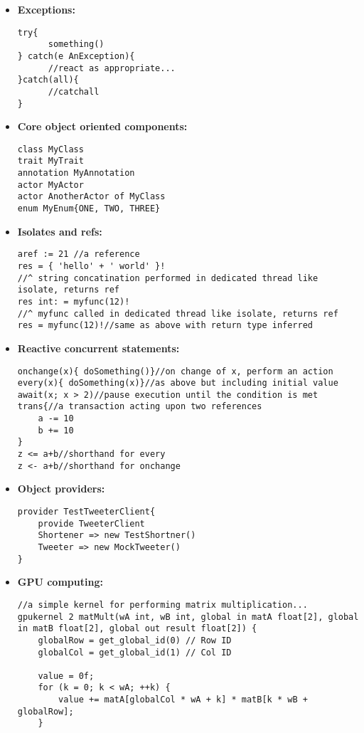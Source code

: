\documentclass[conc-doc]{subfiles}
\begin{document}
\begin{itemize}
	
	\item \textbf{Exceptions:}
\begin{lstlisting}
try{
	  something()
} catch(e AnException){
	  //react as appropriate...
}catch(all){
	  //catchall
}
\end{lstlisting}

	\item \textbf{Core object oriented components:}
\begin{lstlisting}
class MyClass
trait MyTrait
annotation MyAnnotation
actor MyActor
actor AnotherActor of MyClass
enum MyEnum{ONE, TWO, THREE}
\end{lstlisting}


\item \textbf{Isolates and refs:}
\begin{lstlisting}
aref := 21 //a reference
res = { 'hello' + ' world' }!
//^ string concatination performed in dedicated thread like isolate, returns ref
res int: = myfunc(12)!
//^ myfunc called in dedicated thread like isolate, returns ref
res = myfunc(12)!//same as above with return type inferred
\end{lstlisting}


	\item \textbf{Reactive concurrent statements:}
	\begin{lstlisting}
onchange(x){ doSomething()}//on change of x, perform an action
every(x){ doSomething(x)}//as above but including initial value
await(x; x > 2)//pause execution until the condition is met
trans{//a transaction acting upon two references
	a -= 10
	b += 10
}
z <= a+b//shorthand for every
z <- a+b//shorthand for onchange
	\end{lstlisting}
	
	\item \textbf{Object providers:}
	\begin{lstlisting}
provider TestTweeterClient{
	provide TweeterClient
	Shortener => new TestShortner()
	Tweeter => new MockTweeter()
}
	\end{lstlisting}
	
	\item \textbf{GPU computing:}
	\begin{lstlisting}
//a simple kernel for performing matrix multiplication...
gpukernel 2 matMult(wA int, wB int, global in matA float[2], global in matB float[2], global out result float[2]) {
	globalRow = get_global_id(0) // Row ID
	globalCol = get_global_id(1) // Col ID
	
	value = 0f;
	for (k = 0; k < wA; ++k) {
		value += matA[globalCol * wA + k] * matB[k * wB + globalRow];
	}
	

\end{lstlisting}
\end{itemize}
\end{document}
